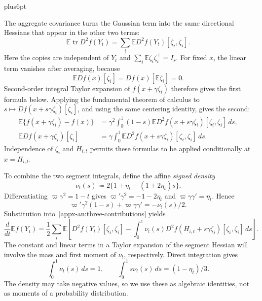 \documentclass[11pt,letterpaper,twoside,leqno]{article}
\makeatletter
\theoremstyle{bookplain}
\theoremstyle{bookremark}
\renewenvironment{proof}[1][\proofname]{\par
  \pushQED{\qed}\normalfont\topsep6pt plus6pt\relax
  \trivlist\item[\hskip\labelsep\bfseries #1\@addpunct{.}]\ignorespaces
}{\popQED\endtrivlist\@endpefalse}
\newcommand{\E}{\mathbb E}
\newcommand{\tr}{\operatorname{tr}}
\newcommand{\dd}{\,d}
\makeatother
\begin{document}
\begin{proof}
The aggregate covariance turns the Gaussian term into the same
directional Hessians that appear in the other two terms:
\[
 \E\tr D^2f(Y_t)
 =\sum_i\E D^2f(Y_t)[\zeta_i,\zeta_i].
\]
Here the copies are independent of \(Y_t\) and
\(\sum_i\E\zeta_i\zeta_i^\top=I_r\).
For fixed $x$, the linear term vanishes after averaging, because
\[
 \E Df(x)[\zeta_i]=Df(x)[\E\zeta_i]=0.
\]
Second-order integral Taylor expansion of $f(x+\gamma\zeta_i)$
therefore gives the first formula below. Applying the fundamental
theorem of calculus to
$s\mapsto Df(x+s\gamma\zeta_i)[\zeta_i]$, and using the same
centering identity, gives the second:
\begin{align*}
 \E\{f(x+\gamma\zeta_i)-f(x)\}
 &=\gamma^2\int_0^1(1-s)
        \E D^2f(x+s\gamma\zeta_i)[\zeta_i,\zeta_i]\dd s,\\
 \E Df(x+\gamma\zeta_i)[\zeta_i]
 &=\gamma\int_0^1
        \E D^2f(x+s\gamma\zeta_i)[\zeta_i,\zeta_i]\dd s.
\end{align*}
Independence of \(\zeta_i\) and \(H_{i,t}\) permits these formulas
to be applied conditionally at \(x=H_{i,t}\).

To combine the two segment integrals, define the affine
\emph{signed density}
\[
 \nu_t(s)\coloneqq2\{1+\eta_t-(1+2\eta_t)s\}.
\]
Differentiating \(\varpi\gamma^2=1-t\) gives
\(\varpi'\gamma^2=-1-2\eta_t\) and
\(\varpi\gamma\gamma'=\eta_t\). Hence
\[
 \varpi'\gamma^2(1-s)+\varpi\gamma\gamma'
 =-\nu_t(s)/2.
\]
Substitution into~\eqref{appx-an:three-contributions} yields
\begin{equation}
 \frac{d}{dt}\E f(Y_t)
 =\frac12\sum_i\E\left[
    D^2f(Y_t)[\zeta_i,\zeta_i]
    -\int_0^1\nu_t(s)D^2f(H_{i,t}+s\gamma\zeta_i)
                       [\zeta_i,\zeta_i]\dd s\right].
 \label{appx-an:signed-hessian}
\end{equation}
The constant and linear terms in a Taylor expansion of the
segment Hessian will involve the mass and first moment of
$\nu_t$, respectively. Direct integration gives
\begin{equation}
 \int_0^1\nu_t(s)\dd s=1,\qquad
 \int_0^1s\nu_t(s)\dd s=(1-\eta_t)/3.
 \label{appx-an:signed-moments}
\end{equation}
The density may take negative values, so we use these as algebraic identities,
not as moments of a probability distribution.


\end{proof}
\end{document}
